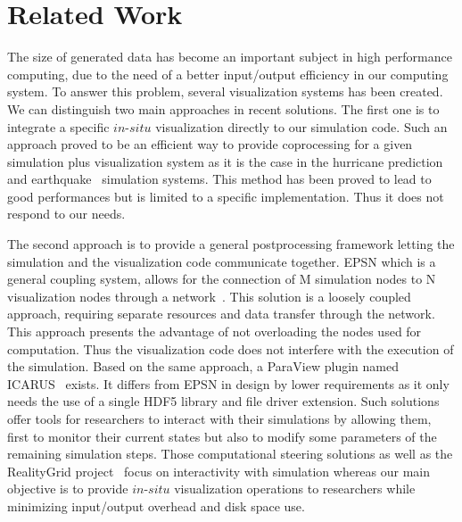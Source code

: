 \section{Related Work}
\label{sec:related}

The size of generated data has become an important subject in high performance 
computing, due to the need of a better input/output efficiency in our computing 
system. To answer this problem, several visualization systems has been created.
We can distinguish two main approaches in recent solutions. The first one is to 
integrate a specific $in$-$situ$ visualization directly to our simulation code. 
Such an approach proved to be an efficient way to provide coprocessing for a given
simulation plus visualization system as it is the case in the hurricane
prediction~\cite{4015457} and earthquake~\cite{4090186} simulation systems.
This method has been proved to lead to good performances but is limited 
to a specific implementation. Thus it does not respond to our needs. 

The second approach is to provide a general postprocessing framework letting the
simulation and the visualization code communicate together. EPSN which is a
general coupling system, allows for the connection of M simulation nodes to N
visualization nodes through a network~\cite{4020782}. This solution is a
loosely coupled approach, requiring separate resources and data transfer
through the network. This approach presents the advantage of not overloading
the nodes used for computation. Thus the visualization code does not interfere
with the execution of the simulation. Based on the same approach, a ParaView
plugin named ICARUS~\cite{6152102}
exists. It differs from EPSN in design by lower requirements as it only needs
the use of a single HDF5 library and file driver extension. Such solutions
offer tools for researchers to interact with their simulations by allowing
them, first to monitor their current states but also to modify
some parameters of the remaining simulation steps. Those computational steering
solutions as well as the RealityGrid
project~\cite{Harting03computationalsteering} focus on interactivity with
simulation whereas our main objective is to provide $in$-$situ$ visualization
operations to researchers while minimizing input/output overhead and disk
space use. 

